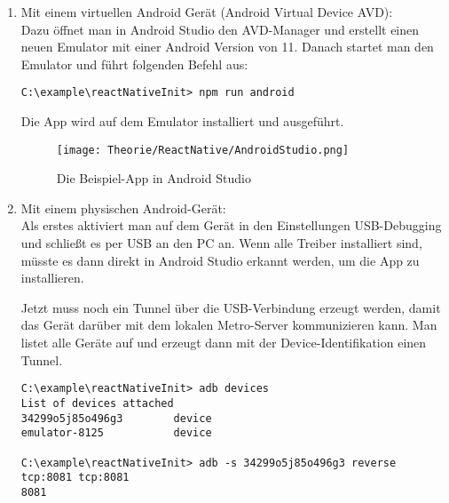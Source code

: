 \begin{enumerate}
  \item Mit einem virtuellen Android Gerät (Android Virtual Device AVD):\\
Dazu öffnet man in Android Studio den AVD-Manager und erstellt einen neuen Emulator mit einer
Android Version von 11. Danach startet man den Emulator und führt folgenden Befehl aus:

\begin{lstlisting}
C:\example\reactNativeInit> npm run android
\end{lstlisting}

Die App wird auf dem Emulator installiert und ausgeführt.

\begin{figure}[H]
  \begin{center}
    \texttt{[image: Theorie/ReactNative/AndroidStudio.png]}
    \caption{Die Beispiel-App in Android Studio}
  \end{center}
\end{figure}

\newpage
  \item Mit einem physischen Android-Gerät:\\
Als erstes aktiviert man auf dem Gerät in den Einstellungen USB-Debugging und schließt es per USB an
den PC an. Wenn alle Treiber installiert sind, müsste es dann direkt in Android Studio erkannt
werden, um die App zu installieren.

Jetzt muss noch ein Tunnel über die USB-Verbindung erzeugt werden, damit das Gerät darüber mit dem
lokalen Metro-Server kommunizieren kann. Man listet alle Geräte auf und erzeugt dann mit der
Device-Identifikation einen Tunnel.

\begin{lstlisting}
C:\example\reactNativeInit> adb devices
List of devices attached
34299o5j85o496g3        device
emulator-8125           device

C:\example\reactNativeInit> adb -s 34299o5j85o496g3 reverse tcp:8081 tcp:8081
8081
\end{lstlisting}

\end{enumerate}